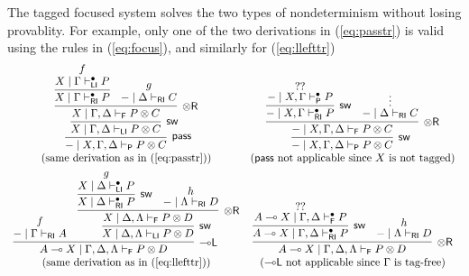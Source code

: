 \documentclass[submission,copyright,creativecommons]{eptcs}
\theoremstyle{definition}
\newcommand{\tr}{\otimes \mathsf{R}}
\newcommand{\lleft}{{\multimap}\mathsf{L}}
\newcommand{\pass}{\mathsf{pass}}
\newcommand{\ot}{\otimes}
\newcommand{\lolli}{\multimap}
\newcommand{\RI}{\mathsf{RI}}
\newcommand{\LI}{\mathsf{LI}}
\newcommand{\Pass}{\mathsf{P}}
\newcommand{\F}{\mathsf{F}}
\begin{document}
The tagged focused system solves the two types of nondeterminism without losing provablity. For example, only one of the two derivations in (\ref{eq:passtr}) is valid using the rules in (\ref{eq:focus}), and similarly for (\ref{eq:llefttr})
\begin{displaymath}
  \begin{array}{cc}
      \infer[\pass]{- \mid X , \Gamma , \Delta \vdash_{\Pass} P \ot C}{
        \infer[\mathsf{sw}]{X \mid \Gamma , \Delta \vdash_{\LI} P \ot C}{
          \infer[\tr]{X \mid \Gamma , \Delta \vdash_{\F} P \ot C}{
            \infer{X \mid \Gamma \vdash^{\bullet}_{\RI} P}{
              \deduce{X \mid \Gamma \vdash^{\bullet}_{\LI} P}{f}
              }
            &
            \deduce{- \mid \Delta \vdash_{\RI} C}{g}
          }
        }
      }
    &
    \infer[\mathsf{sw}]{- \mid X , \Gamma , \Delta \vdash_{\Pass} P \ot C}{
      \infer[\tr]{- \mid X , \Gamma , \Delta \vdash_{\F} P \ot C}{
        \infer[\mathsf{sw}]{- \mid X , \Gamma \vdash^{\bullet}_{\RI} P}{
          \deduce{- \mid X , \Gamma \vdash^{\bullet}_{\Pass} P}{??}
        }
        &
        \deduce{- \mid \Delta \vdash_{\RI} C}{\vdots}
      }
    }
    \\
    (\text{same derivation as in (\ref{eq:passtr})})
    &
    (\text{$\pass$ not applicable since $X$ is not tagged})
    \\[6pt]
      \infer[\lleft]{A \lolli X \mid \Gamma , \Delta , \Lambda \vdash_{\F} P \ot D}{
        \deduce{- \mid \Gamma \vdash_{\RI} A}{f}
        &
        \infer[\mathsf{sw}]{X \mid \Delta , \Lambda \vdash_{\LI} P \ot D}{
          \infer[\tr]{X \mid \Delta , \Lambda \vdash_{\F} P \ot D}{
            \infer[\mathsf{sw}]{X \mid \Delta \vdash^{\bullet}_{\RI} P}{
              \deduce{X \mid \Delta \vdash^{\bullet}_{\LI} P}{g}
              }
            &
            \deduce{- \mid \Lambda \vdash_{\RI} D}{h}
          }
        }
      }
    &
      \infer[\tr]{A \lolli X \mid \Gamma , \Delta , \Lambda \vdash_{\F} P \ot D}{
        \infer[\mathsf{sw}]{A \lolli X \mid \Gamma , \Delta \vdash^{\bullet}_{\RI} P}{
          \deduce{A \lolli X \mid \Gamma , \Delta \vdash^{\bullet}_{\F} P}{??}
        }
        &
        \deduce{- \mid \Lambda \vdash_{\RI} D}{h}
      }
    \\
    (\text{same derivation as in (\ref{eq:llefttr})})
    &
    (\text{$\lleft$ not applicable since $\Gamma$ is tag-free})
   \end{array}
  \end{displaymath}
\end{document}

